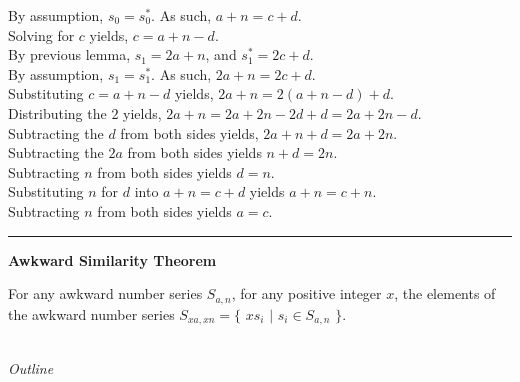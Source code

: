 \documentclass[a4paper,12pt]{article}
\begin{document}
\noindent By assumption, $s_0 = s^*_0$. As such, $a + n = c + d$.\\

\noindent Solving for $c$ yields, $c = a + n - d$.\\

\noindent By previous lemma, $s_1 = 2a + n$, and $s^*_1 = 2c + d$.\\

\noindent By assumption, $s_1 = s^*_1$. As such, $2a + n = 2c + d$.\\

\noindent Substituting $c = a + n - d$ yields, $2a + n = 2(a + n - d) + d$.\\

\noindent Distributing the $2$ yields, $2a + n = 2a + 2n - 2d + d = 2a + 2n - d$.\\

\noindent Subtracting the $d$ from both sides yields, $2a + n + d = 2a + 2n$.\\

\noindent Subtracting the $2a$ from both sides yields $n + d = 2n$.\\

\noindent Subtracting $n$ from both sides yields $d = n$.\\

\noindent Substituting $n$ for $d$ into $a + n = c + d$ yields $a + n = c + n$.\\

\noindent Subtracting $n$ from both sides yields $a = c$.

\begin{center}
\noindent\rule{8cm}{0.4pt}
\end{center}











\label{theorem:similar_theorem}
\hypertarget{theorem:similar_theorem}{}
\begin{tcolorbox}
\textbf{Awkward Similarity Theorem}

\noindent For any awkward number series $S_{a, n}$, for any positive integer $x$, the elements of the awkward number series $S_{xa, xn} = \{$ $xs_i$ $|$ $s_i \in S_{a,n}$ $\}$.
\end{tcolorbox}

\noindent \\
\textit{Outline}
\end{document}
